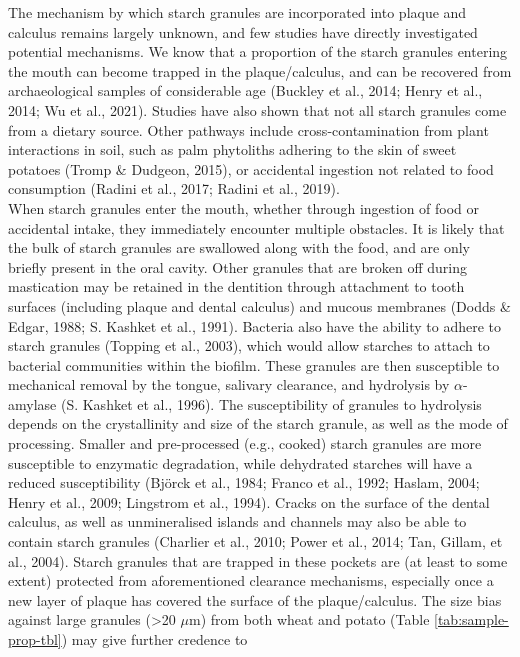 \documentclass[
]{article}
\begin{document}
The mechanism by which starch granules are incorporated into plaque and calculus
remains largely unknown, and few studies have directly investigated potential
mechanisms. We know that a proportion of the starch granules entering
the mouth can become trapped in the plaque/calculus, and can be recovered from
archaeological samples of considerable age
(Buckley et al., 2014; Henry et al., 2014; Wu et al., 2021).
Studies have also shown that not all starch granules come from a dietary source.
Other pathways include cross-contamination from plant interactions in soil, such
as palm phytoliths adhering to the skin of sweet potatoes
(Tromp \& Dudgeon, 2015),
or accidental ingestion not related to food consumption
(Radini et al., 2017; Radini et al., 2019).\\
When starch granules enter the mouth, whether through ingestion of food or accidental
intake, they immediately encounter multiple obstacles. It is likely
that the bulk of starch granules are swallowed along with the food, and are
only briefly present in the oral cavity. Other granules that are broken off
during mastication may be retained in the dentition through attachment to
tooth surfaces (including plaque and dental calculus) and mucous membranes
(Dodds \& Edgar, 1988; S. Kashket et al., 1991).
Bacteria also have the ability to adhere to starch granules
(Topping et al., 2003),
which would allow starches to attach to bacterial communities within the biofilm.
These granules are then
susceptible to mechanical removal by the tongue, salivary clearance, and hydrolysis
by \(\alpha\)-amylase (S. Kashket et al., 1996).
The susceptibility of granules to hydrolysis depends on the crystallinity and size
of the starch granule, as well as the mode of processing. Smaller and pre-processed
(e.g., cooked) starch granules are more susceptible to enzymatic degradation,
while dehydrated starches will have a reduced susceptibility
(Björck et al., 1984; Franco et al., 1992; Haslam, 2004; Henry et al., 2009; Lingstrom et al., 1994).
Cracks on the surface of the dental calculus, as well as unmineralised islands
and channels may also be able to contain starch granules
(Charlier et al., 2010; Power et al., 2014; Tan, Gillam, et al., 2004).
Starch granules that are trapped in these pockets are (at least to some extent)
protected from aforementioned clearance mechanisms, especially once
a new layer of plaque has covered the surface of the plaque/calculus.
The size bias against large granules (\textgreater20 \(\mu\)m) from both wheat and potato
(Table \ref{tab:sample-prop-tbl}) may give further credence to
\end{document}
